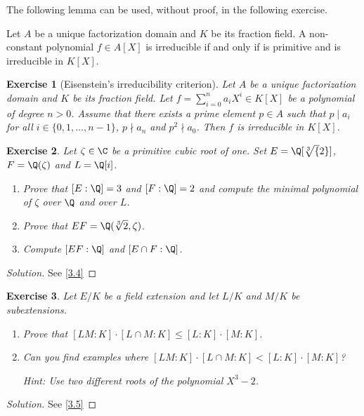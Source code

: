\documentclass[a4paper,10pt,reqno]{amsart}
\newtheorem{ex}{Exercise}[section]
\newenvironment{sol}
  {\renewcommand\qedsymbol{$\blacksquare$}\begin{proof}[Solution]}
  {\end{proof}}
\begin{document}
The following lemma can be used, without proof, in the following exercise.

\begin{lem*}
    Let $A$ be a unique factorization domain and $K$ be its fraction field.
    A non-constant polynomial $f\in A[X]$ is irreducible if and only if is primitive and is irreducible in $K[X]$.
\end{lem*}

\begin{ex} [Eisenstein's irreducibility criterion]\label{2.3}
    Let $A$ be a unique factorization domain and $K$ be its fraction field.
    Let $f=\sum_{i=0}^n a_iX^i\in K[X]$ be a polynomial of degree $n>0$. 
    Assume that there exists a prime element $p\in A$ such that
    $p\mid a_i$ for all $i\in\{0,1,\dots,n-1\}$, $p\nmid a_n$ and
    $p^2\nmid a_0$. Then $f$ is irreducible in $K[X]$. 
\end{ex}



\begin{ex}
\label{2.4}
Let $\zeta\in\C$ be a primitive cubic root of one.
Set $E=\Q[\sqrt[3]{2}]$, $F=\Q(\zeta)$ and $L=\Q[i]$.
\begin{enumerate}[label=(\roman*)]
    \item Prove that $[E:\Q]=3$ and $[F:\Q]=2$ and compute the minimal polynomial of $\zeta$ over $\Q$ and over $L$.
    \item Prove that $EF=\Q(\sqrt[3]{2},\zeta)$.
    \item Compute $[EF:\Q]$ and $[E\cap F:\Q]$.
\end{enumerate}  
\end{ex}
\begin{sol}
    See \cref{3.4}
\end{sol}

\begin{ex}\label{2.5}
    Let $E/K$ be a field extension and let $L/K$ and $M/K$ be subextensions.
    \begin{enumerate}[label=(\roman*)]
    \item Prove that $[LM : K ] \cdot [L \cap M : K] \leq [L:K] \cdot [M:K]$.
    \item Can you find examples where $[LM : K ] \cdot [L \cap M : K] < [L:K] \cdot [M:K]$?
    
    \noindent \textit{Hint:} Use two different roots of the polynomial $X^3 -2$.
    \end{enumerate}  
\end{ex}
\begin{sol}
    See \cref{3.5}
\end{sol}
\end{document}
